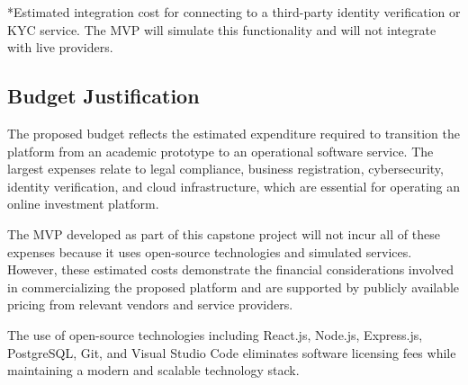 \vspace{0.2cm}

\footnotesize
*Estimated integration cost for connecting to a third-party identity verification or KYC service. The MVP will simulate this functionality and will not integrate with live providers.
\normalsize


\subsection{Budget Justification}

The proposed budget reflects the estimated expenditure required to transition the platform from an academic prototype to an operational software service. The largest expenses relate to legal compliance, business registration, cybersecurity, identity verification, and cloud infrastructure, which are essential for operating an online investment platform.

The MVP developed as part of this capstone project will not incur all of these expenses because it uses open-source technologies and simulated services. However, these estimated costs demonstrate the financial considerations involved in commercializing the proposed platform and are supported by publicly available pricing from relevant vendors and service providers.

The use of open-source technologies including React.js, Node.js, Express.js, PostgreSQL, Git, and Visual Studio Code eliminates software licensing fees while maintaining a modern and scalable technology stack.